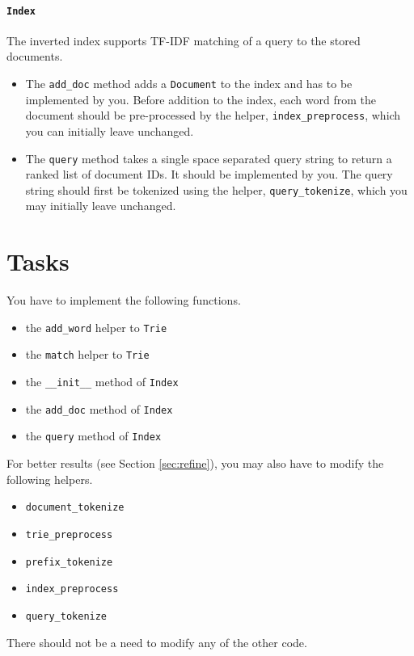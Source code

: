 \documentclass[addpoints]{exam}
\begin{document}
\paragraph{\texttt{Index}} The inverted index supports TF-IDF matching of a query to the stored documents.
\begin{itemize}
\item The \texttt{add\_doc} method adds a \texttt{Document} to the index and has to be implemented by you. Before addition to the index, each word from the document should be pre-processed by the helper, \texttt{index\_preprocess}, which you can initially leave unchanged.
\item The \texttt{query} method takes a single space separated query string to return a ranked list of document IDs. It should be implemented by you. The query string should first be tokenized using the helper, \texttt{query\_tokenize}, which you may initially leave unchanged.
\end{itemize}

\section{Tasks}

You have to implement the following functions.
\begin{itemize}
\item the \texttt{add\_word} helper to \texttt{Trie}
\item the \texttt{match} helper to \texttt{Trie}
\item the \texttt{\_\_init\_\_} method of \texttt{Index}
\item the \texttt{add\_doc} method of \texttt{Index}
\item the \texttt{query} method of \texttt{Index}
\end{itemize}

\noindent For better results (see Section \ref{sec:refine}), you may also have to modify the following helpers.
\begin{itemize}
\item \texttt{document\_tokenize}
\item \texttt{trie\_preprocess}
\item \texttt{prefix\_tokenize}
\item \texttt{index\_preprocess}
\item \texttt{query\_tokenize}
\end{itemize}

There should not be a need to modify any of the other code.
\end{document}

